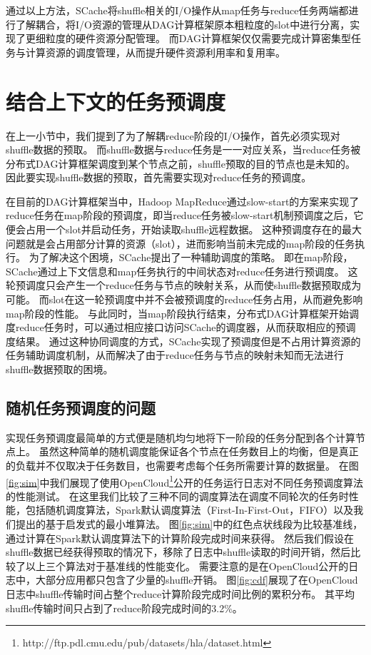 通过以上方法，SCache将shuffle相关的I/O操作从map任务与reduce任务两端都进行了解耦合，将I/O资源的管理从DAG计算框架原本粗粒度的slot中进行分离，实现了更细粒度的硬件资源分配管理。
而DAG计算框架仅仅需要完成计算密集型任务与计算资源的调度管理，从而提升硬件资源利用率和复用率。

\section{结合上下文的任务预调度}

在上一小节中，我们提到了为了解耦reduce阶段的I/O操作，首先必须实现对shuffle数据的预取。
而shuffle数据与reduce任务是一一对应关系，当reduce任务被分布式DAG计算框架调度到某个节点之前，shuffle预取的目的节点也是未知的。
因此要实现shuffle数据的预取，首先需要实现对reduce任务的预调度。

在目前的DAG计算框架当中，Hadoop MapReduce通过slow-start\cite{hadoop}的方案来实现了reduce任务在map阶段的预调度，即当reduce任务被slow-start机制预调度之后，它便会占用一个slot并启动任务，开始读取shuffle远程数据。
这种预调度存在的最大问题就是会占用部分计算的资源（slot），进而影响当前未完成的map阶段的任务执行。
为了解决这个困境，SCache提出了一种辅助调度的策略。
即在map阶段，SCache通过上下文信息和map任务执行的中间状态对reduce任务进行预调度。
这轮预调度只会产生一个reduce任务与节点的映射关系，从而使shuffle数据预取成为可能。
而slot在这一轮预调度中并不会被预调度的reduce任务占用，从而避免影响map阶段的性能。
与此同时，当map阶段执行结束，分布式DAG计算框架开始调度reduce任务时，可以通过相应接口访问SCache的调度器，从而获取相应的预调度结果。
通过这种协同调度的方式，SCache实现了预调度但是不占用计算资源的任务辅助调度机制，从而解决了由于reduce任务与节点的映射未知而无法进行shuffle数据预取的困境。

\subsection{随机任务预调度的问题}

实现任务预调度最简单的方式便是随机均匀地将下一阶段的任务分配到各个计算节点上。
虽然这种简单的随机调度能保证各个节点在任务数目上的均衡，但是真正的负载并不仅取决于任务数目，也需要考虑每个任务所需要计算的数据量。
在图\ref{fig:sim}中我们展现了使用OpenCloud\footnote{http://ftp.pdl.cmu.edu/pub/datasets/hla/dataset.html}公开的任务运行日志对不同任务预调度算法的性能测试。
在这里我们比较了三种不同的调度算法在调度不同轮次的任务时性能，包括随机调度算法，Spark默认调度算法（First-In-First-Out，FIFO）\cite{apachespark}以及我们提出的基于启发式的最小堆算法。
图\ref{fig:sim}中的红色点状线段为比较基准线，通过计算在Spark默认调度算法下的计算阶段完成时间来获得。
然后我们假设在shuffle数据已经获得预取的情况下，移除了日志中shuffle读取的时间开销，然后比较了以上三个算法对于基准线的性能变化。
需要注意的是在OpenCloud公开的日志中，大部分应用都只包含了少量的shuffle开销。
图\ref{fig:cdf}展现了在OpenCloud日志中shuffle传输时间占整个reduce计算阶段完成时间比例的累积分布。
其平均shuffle传输时间只占到了reduce阶段完成时间的3.2\%。

